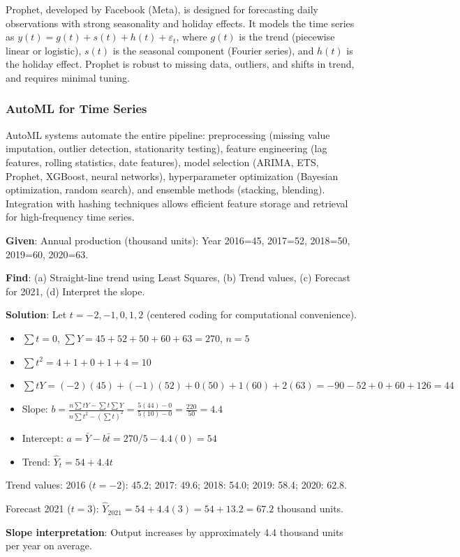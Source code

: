 \documentclass[11pt,a4paper]{article}
\begin{document}
Prophet, developed by Facebook (Meta), is designed for forecasting daily observations with strong seasonality and holiday effects. It models the time series as $y(t) = g(t) + s(t) + h(t) + \varepsilon_t$, where $g(t)$ is the trend (piecewise linear or logistic), $s(t)$ is the seasonal component (Fourier series), and $h(t)$ is the holiday effect. Prophet is robust to missing data, outliers, and shifts in trend, and requires minimal tuning.

\subsubsection{AutoML for Time Series}

AutoML systems automate the entire pipeline: preprocessing (missing value imputation, outlier detection, stationarity testing), feature engineering (lag features, rolling statistics, date features), model selection (ARIMA, ETS, Prophet, XGBoost, neural networks), hyperparameter optimization (Bayesian optimization, random search), and ensemble methods (stacking, blending). Integration with hashing techniques allows efficient feature storage and retrieval for high-frequency time series.

\begin{tcolorbox}[colback=blue!5!white,colframe=blue!75!black,title=\textbf{Worked Example 11: Least Squares Trend Fitting}]
\textbf{Given}: Annual production (thousand units): Year 2016=45, 2017=52, 2018=50, 2019=60, 2020=63.

\textbf{Find}: (a) Straight-line trend using Least Squares, (b) Trend values, (c) Forecast for 2021, (d) Interpret the slope.

\textbf{Solution}: Let $t = -2, -1, 0, 1, 2$ (centered coding for computational convenience).
\begin{itemize}
    \item $\sum t = 0$, $\sum Y = 45+52+50+60+63 = 270$, $n=5$
    \item $\sum t^2 = 4+1+0+1+4 = 10$
    \item $\sum tY = (-2)(45)+(-1)(52)+0(50)+1(60)+2(63) = -90-52+0+60+126 = 44$
    \item Slope: $b = \frac{n\sum tY - \sum t \sum Y}{n\sum t^2 - (\sum t)^2} = \frac{5(44) - 0}{5(10) - 0} = \frac{220}{50} = 4.4$
    \item Intercept: $a = \bar{Y} - b\bar{t} = 270/5 - 4.4(0) = 54$
    \item Trend: $\hat{Y}_t = 54 + 4.4t$
\end{itemize}
Trend values: 2016 ($t=-2$): 45.2; 2017: 49.6; 2018: 54.0; 2019: 58.4; 2020: 62.8.

Forecast 2021 ($t=3$): $\hat{Y}_{2021} = 54 + 4.4(3) = 54 + 13.2 = 67.2$ thousand units.

\textbf{Slope interpretation}: Output increases by approximately 4.4 thousand units per year on average.
\end{tcolorbox}
\end{document}
